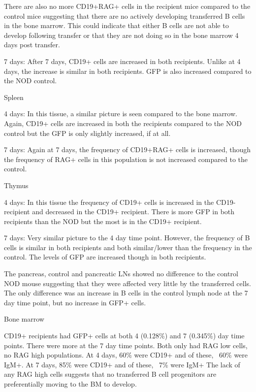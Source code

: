 There are also no more CD19+RAG+ cells in the recipient mice compared to the control mice suggesting that there are no actively developing transferred B cells in the bone marrow.
This could indicate that either B cells are not able to develop following transfer or that they are not doing so in the bone marrow 4 days post transfer.

7 days:
After 7 days, CD19+ cells are increased in both recipients. 
Unlike at 4 days, the increase is similar in both recipients.
GFP is also increased compared to the NOD control.

Spleen

4 days:
In this tissue, a similar picture is seen compared to the bone marrow. 
Again, CD19+ cells are increased in both the recipients compared to the NOD control but the GFP is only slightly increased, if at all.

7 days:
Again at 7 days, the frequency of CD19+RAG+ cells is increased, though the frequency of RAG+ cells in this population is not increased compared to the control.


Thymus

4 days:
In this tissue the frequency of CD19+ cells is increased in the CD19- recipient and decreased in the CD19+ recipient.
There is more GFP in both recipients than the NOD but the most is in the CD19+ recipient.

7 days:
Very similar picture to the 4 day time point.
However, the frequency of B cells is similar in both recipients and both similar/lower than the frequency in the control.
The levels of GFP are increased though in both recipients.


The pancreas, control and pancreatic LNs showed no difference to the control NOD mouse suggesting that they were affected very little by the transferred cells. 
The only difference was an increase in B cells in the control lymph node at the 7 day time point, but no increase in GFP+ cells.



Bone marrow 


CD19+ recipients had GFP+ cells at both 4 (0.128\%) and 7 (0.345\%) day time points. There were more at the 7 day time points. Both only had RAG low cells, no RAG high populations.
At 4 days, 60\% were CD19+ and of these, ~60\% were IgM+.
At 7 days, 85\% were CD19+ and of these, ~7\% were IgM+
The lack of any RAG high cells suggests that no transferred B cell progenitors are preferentially moving to the BM to develop.

